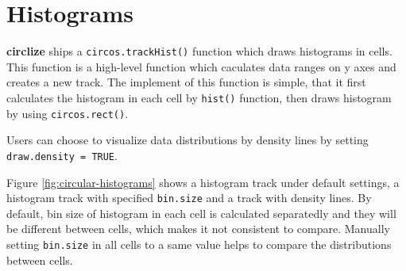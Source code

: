 \documentclass[]{book}
\newenvironment{Shaded}{\begin{snugshade}}{\end{snugshade}}
\newcommand{\KeywordTok}[1]{\textcolor[rgb]{0.13,0.29,0.53}{\textbf{#1}}}
\newcommand{\DataTypeTok}[1]{\textcolor[rgb]{0.13,0.29,0.53}{#1}}
\newcommand{\DecValTok}[1]{\textcolor[rgb]{0.00,0.00,0.81}{#1}}
\newcommand{\FloatTok}[1]{\textcolor[rgb]{0.00,0.00,0.81}{#1}}
\newcommand{\StringTok}[1]{\textcolor[rgb]{0.31,0.60,0.02}{#1}}
\newcommand{\OtherTok}[1]{\textcolor[rgb]{0.56,0.35,0.01}{#1}}
\newcommand{\OperatorTok}[1]{\textcolor[rgb]{0.81,0.36,0.00}{\textbf{#1}}}
\newcommand{\NormalTok}[1]{#1}
\theoremstyle{definition}
\theoremstyle{definition}
\theoremstyle{remark}
\begin{document}
\section{Histograms}\label{histograms}

\textbf{circlize} ships a \texttt{circos.trackHist()} function which
draws histograms in cells. This function is a high-level function which
caculates data ranges on y axes and creates a new track. The implement
of this function is simple, that it first calculates the histogram in
each cell by \texttt{hist()} function, then draws histogram by using
\texttt{circos.rect()}.

Users can choose to visualize data distributions by density lines by
setting \texttt{draw.density\ =\ TRUE}.

Figure \ref{fig:circular-histograms} shows a histogram track under
default settings, a histogram track with specified \texttt{bin.size} and
a track with density lines. By default, bin size of histogram in each
cell is calculated separatedly and they will be different between cells,
which makes it not consistent to compare. Manually setting
\texttt{bin.size} in all cells to a same value helps to compare the
distributions between cells.

\begin{Shaded}
\end{Shaded}
\end{document}
